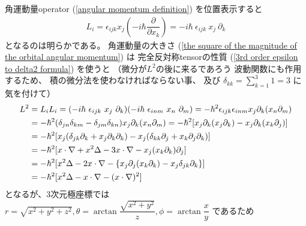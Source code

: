 角運動量operator
(\ref{angular momentum definition})
を位置表示すると
\begin{align}
    L_i
=
    \epsilon_{ijk}
    x_j \left(
        - i \hbar \dfrac{\partial}{\partial x_k}
    \right)
=
    - i \hbar\ 
    \epsilon_{ijk}\ 
    x_j\ \partial_k
\end{align}
となるのは明らかである。
角運動量の大きさ
(\ref{the square of the magnitude of the orbital angular momentum})
は
完全反対称tensorの性質
(\ref{3rd order epsilon to delta2 formula})
を使うと
（微分が$L^2$の後に来るであろう
波動関数にも作用するため、
積の微分法を使わなければならない事、
及び
$\displaystyle
\delta_{kk} = \sum_{k = 1}^3 1
= 3$
に気を付けて）
\begin{align}
    L^2
    &= L_i L_i
=
    (- i \hbar\ 
    \epsilon_{ijk}\ 
    x_j\ \partial_k)
    (- i \hbar\ 
    \epsilon_{inm}\ 
    x_n\ \partial_m)
=
    - \hbar^2
    \epsilon_{ijk}
    \epsilon_{inm}
    x_j \partial_k
    (x_n \partial_m)
\notag\\&
=
    - \hbar^2
    (\delta_{jn} \delta_{km}
    - \delta_{jm} \delta_{kn})
    x_j \partial_k
    (x_n \partial_m)
=
    - \hbar^2
    [
        x_j \partial_k
        (x_j \partial_k)
    -
        x_j \partial_k
        (x_k \partial_j)
    ]
\notag\\&
=
    - \hbar^2
    [
        x_j
        (
            \delta_{jk} \partial_k
        +
            x_j \partial_k \partial_k
        )
    -
        x_j
        (
            \delta_{kk} \partial_j
        +
            x_k \partial_j \partial_k
        )
    ]
\notag\\&
=
    - \hbar^2
    [
        \bm{x} \cdot \nabla
    +
        \bm{x}^2
        \Delta
    -
        3 \bm{x} \cdot \nabla
    -
        x_j (x_k \partial_k) \partial_j
    ]
\notag\\&
=
    - \hbar^2
    [
        \bm{x}^2
        \Delta
    -
        2 \bm{x} \cdot \nabla
    -
        \{
            x_j \partial_j
            (x_k \partial_k)
        -
            x_j \delta_{jk} \partial_k
        \}
    ]
\notag\\&
=
    - \hbar^2
    [
        \bm{x}^2
        \Delta
    -
        \bm{x} \cdot \nabla
    -
        (\bm{x} \cdot \nabla)^2
    ]
\end{align}
となるが、$3$次元極座標では
$r = \sqrt{x^2 + y^2 + z^2},
\theta = \arctan
\dfrac{\sqrt{x^2 + y^2}}{z},
\phi = \arctan \dfrac{x}{y}
$
であるため
